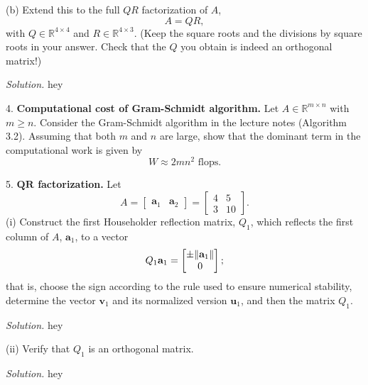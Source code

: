 \documentclass{article}
\def\*#1{\mathbf{#1}}
\newcommand{\R}{\mathbb{R}}
\begin{document}
\vspace{5mm}

(b) Extend this to the full $QR$ factorization of $A$,
%
\begin{equation*}
    A = QR,
\end{equation*}
%
with $Q \in \R^{4 \times 4}$ and $R \in \R^{4 \times 3}$. (Keep the square
roots and the divisions by square roots in your answer. Check that the $Q$
you obtain is indeed an orthogonal matrix!)

\textit{Solution.}
hey

\newpage

4. \textbf{Computational cost of Gram-Schmidt algorithm.}
Let $A \in \R^{m \times n}$ with $m \geq n$. Consider the Gram-Schmidt
algorithm in the lecture notes (Algorithm 3.2). Assuming that both $m$ and
$n$ are large, show that the dominant term in the computational work is given
by
%
\begin{equation*}
    W \approx 2 m n^2 \text{ flops.}
\end{equation*}

\newpage

5. \textbf{$\boldsymbol{QR}$ factorization.}
Let
%
\begin{equation*}
    A =
    \begin{bmatrix}
        \*a_1 & \*a_2
    \end{bmatrix}
    =
   \begin{bmatrix}
       4 & 5 \\
       3 & 10
   \end{bmatrix}
   .
\end{equation*}
%
(i) Construct the first Householder reflection matrix, $Q_1$, which reflects
the first column of $A$, $\*a_1$, to a vector
%
\begin{equation*}
    Q_1 \*a_1 =
    \begin{bmatrix}
        \pm \enVert{\*a_1} \\
        0
    \end{bmatrix}
    ;
\end{equation*}
%
that is, choose the sign according to the rule used to ensure numerical
stability, determine the vector $\*v_1$ and its normalized version
$\*u_1$, and then the matrix $Q_1$.

\textit{Solution.}
hey

\vspace{5mm}

(ii) Verify that $Q_1$ is an orthogonal matrix.

\textit{Solution.}
hey
\end{document}
